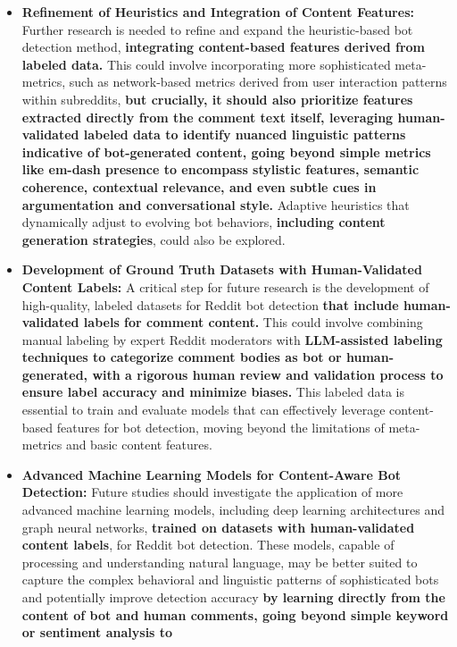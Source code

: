 \documentclass[
  12pt,
  letterpaper,
  DIV=11,
  numbers=noendperiod]{scrartcl}
\begin{document}
\begin{itemize}
\item
  \textbf{Refinement of Heuristics and Integration of Content Features:}
  Further research is needed to refine and expand the heuristic-based
  bot detection method, \textbf{integrating content-based features
  derived from labeled data.} This could involve incorporating more
  sophisticated meta-metrics, such as network-based metrics derived from
  user interaction patterns within subreddits, \textbf{but crucially, it
  should also prioritize features extracted directly from the comment
  text itself, leveraging human-validated labeled data to identify
  nuanced linguistic patterns indicative of bot-generated content, going
  beyond simple metrics like em-dash presence to encompass stylistic
  features, semantic coherence, contextual relevance, and even subtle
  cues in argumentation and conversational style.} Adaptive heuristics
  that dynamically adjust to evolving bot behaviors, \textbf{including
  content generation strategies}, could also be explored.
\item
  \textbf{Development of Ground Truth Datasets with Human-Validated
  Content Labels:} A critical step for future research is the
  development of high-quality, labeled datasets for Reddit bot detection
  \textbf{that include human-validated labels for comment content.} This
  could involve combining manual labeling by expert Reddit moderators
  with \textbf{LLM-assisted labeling techniques to categorize comment
  bodies as bot or human-generated, with a rigorous human review and
  validation process to ensure label accuracy and minimize biases.} This
  labeled data is essential to train and evaluate models that can
  effectively leverage content-based features for bot detection, moving
  beyond the limitations of meta-metrics and basic content features.
\item
  \textbf{Advanced Machine Learning Models for Content-Aware Bot
  Detection:} Future studies should investigate the application of more
  advanced machine learning models, including deep learning
  architectures and graph neural networks, \textbf{trained on datasets
  with human-validated content labels}, for Reddit bot detection. These
  models, capable of processing and understanding natural language, may
  be better suited to capture the complex behavioral and linguistic
  patterns of sophisticated bots and potentially improve detection
  accuracy \textbf{by learning directly from the content of bot and
  human comments, going beyond simple keyword or sentiment analysis to
}
\end{itemize}
\end{document}
